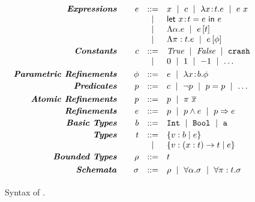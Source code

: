 \newcommand{\ra}[1]{\renewcommand{\arraystretch}{#1}}
\ra{0.9}
\begin{figure}[t!]
\centering
$$
\begin{array}{rrcl}
\emphbf{Expressions} \quad 
  & e & ::=     & x 
                  \spmid c 
                  \spmid \efunt{x}{\rtyp}{e} 
                  \spmid \eapp{e}{x}      \\
  &   &  \spmid & \elet{x}{e}{e}{\rtyp}   \\
  &   &  \spmid & \etabs{\tvar}{e}  
                  \spmid \etapp{e}{\rtyp} \\ 
  &   &  \spmid & \epabs{\rvar}{\rtyp}{e}
                  \spmid \epapp{e}{\constraint}     \\[0.03in] 
  
\emphbf{Constants} \quad
  & c 
  & ::= 
  & \true \spmid \false \spmid \ecrash \\
  && \spmid &  0 \spmid 1 \spmid -1 \spmid \dots
  \\[0.05in] 
  
\emphbf{Parametric Refinements} \quad 
& \constraint & ::= & \reft 
                        \spmid \efunt{x}{b}{\constraint}  \\[0.03in]


\emphbf{Predicates} \quad 
  & \creft & ::= & c \spmid \lnot \creft 
                   \spmid \creft = \creft 
                   \spmid %
                   \dots  \\[0.05in] 

\emphbf{Atomic Refinements} \quad 
  & \areft & ::= & \creft 
                   \spmid \rvapp{\rvar}{x} \\[0.03in] 

\emphbf{Refinements} \quad 
  & \reft & ::= & \areft 
                  \spmid \areft \wedge \reft 
                  \spmid \areft \Rightarrow \reft \\[0.03in] 

\emphbf{Basic Types} \quad 
  & b 
  & ::= & \texttt{Int}
          \spmid \texttt{Bool}
          \spmid \texttt{a}    \\[0.03in]


\emphbf{Types} \quad 
  & \rtyp
  & ::=      & \tref{b}{\reft} \\
  & & \spmid & \trfun{x}{\rtyp}{\rtyp}{\reft} \\[0.03in]

\emphbf{Bounded Types} \quad 
  & \bt
  & ::= & \rtyp \\[0.05in]

\emphbf{Schemata} \quad 
  & \sigma
  & ::= & \bt
          \spmid \ttabs{\tvar}{\sigma}
          \spmid \tpabs{\rvar}{\rtyp}{\sigma} \\[0.03in]
\end{array}
$$
\caption{Syntax of \corelan.}
\label{fig:syntax}
\end{figure}


